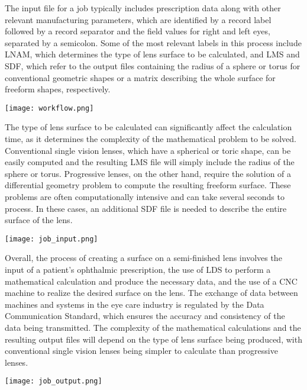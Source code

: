 \documentclass[10pt,a4paper]{report}
\begin{document}
\large\justify The input file for a job typically includes prescription data along with other relevant manufacturing parameters, which are identified by a record label followed by a record separator and the field values for right and left eyes, separated by a semicolon. Some of the most relevant labels in this process include LNAM, which determines the type of lens surface to be calculated, and LMS and SDF, which refer to the output files containing the radius of a sphere or torus for conventional geometric shapes or a matrix describing the whole surface for freeform shapes, respectively.

\begin{center}
    \texttt{[image: workflow.png]}
\end{center}

\large\justify The type of lens surface to be calculated can significantly affect the calculation time, as it determines the complexity of the mathematical problem to be solved. Conventional single vision lenses, which have a spherical or toric shape, can be easily computed and the resulting LMS file will simply include the radius of the sphere or torus. Progressive lenses, on the other hand, require the solution of a differential geometry problem to compute the resulting freeform surface. These problems are often computationally intensive and can take several seconds to process. In these cases, an additional SDF file is needed to describe the entire surface of the lens.

\begin{center}
    \texttt{[image: job\_input.png]}
\end{center}

\large\justify Overall, the process of creating a surface on a semi-finished lens involves the input of a patient's ophthalmic prescription, the use of LDS to perform a mathematical calculation and produce the necessary data, and the use of a CNC machine to realize the desired surface on the lens. The exchange of data between machines and systems in the eye care industry is regulated by the Data Communication Standard, which ensures the accuracy and consistency of the data being transmitted. The complexity of the mathematical calculations and the resulting output files will depend on the type of lens surface being produced, with conventional single vision lenses being simpler to calculate than progressive lenses.
\begin{center}
    \texttt{[image: job\_output.png]}
\end{center}
\end{document}
